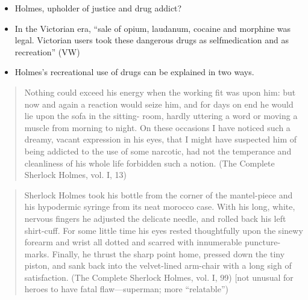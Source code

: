 \documentclass[a4paper,landscape,headrule,footrule,xetex]{foils}
\begin{document}
\makexeCJKinactive
\renewcommand{\avmvalfont}{\it}
\maketitle

%

\begin{itemize}
\item Holmes, upholder of justice and drug addict?
\item In the Victorian era, “sale of opium, laudanum,
cocaine and morphine was legal. Victorian
users took these dangerous drugs as selfmedication and as recreation” (VW)
\item Holmes's recreational use of drugs can be
explained in two ways.
\end{itemize}




\begin{quotation}
Nothing could exceed his energy when the working fit was upon him: but
now and again a reaction would seize him, and for days on end he would lie
upon the sofa in the sitting- room, hardly uttering a word or moving a
muscle from morning to night. On these occasions I have noticed such a
dreamy, vacant expression in his eyes, that I might have suspected him of
being addicted to the use of some narcotic, had not the temperance and
cleanliness of his whole life forbidden such a notion. 
(The Complete Sherlock Holmes, vol. I, 13)
\end{quotation}

\begin{quotation}
Sherlock Holmes took his bottle from the corner of the mantel-piece and his
hypodermic syringe from its neat morocco case. With his long, white,
nervous fingers he adjusted the delicate needle, and rolled back his left
shirt-cuff. For some little time his eyes rested thoughtfully upon the sinewy
forearm and wrist all dotted and scarred with innumerable puncture-marks.
Finally, he thrust the sharp point home, pressed down the tiny piston, and
sank back into the velvet-lined arm-chair with a long sigh of satisfaction.
(The Complete Sherlock Holmes, vol. I, 99) [not unusual for heroes to have
fatal flaw—superman; more “relatable”)
\end{quotation}
\end{document}
